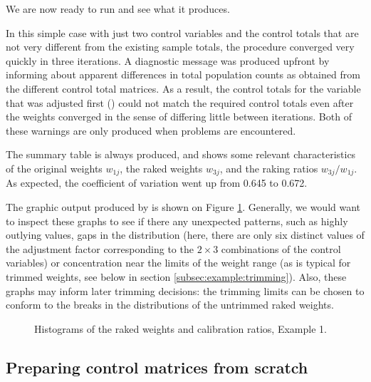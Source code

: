 \begin{stexample}[Example 1]
We are now ready to run  and see what it produces.

\begin{stlog}
\nullskip
\end{stlog}

In this simple case with just two control variables
and the control totals that are not very different from the
existing sample totals, the procedure converged very quickly
in three iterations. A diagnostic message was produced upfront
by  informing about apparent differences in
total population counts as obtained from the different
control total matrices. As a result, the control totals
for the variable that was adjusted first ()
could not match the required control totals even after the
weights converged in the sense of differing little between
iterations. Both of these warnings are only produced when
problems are encountered.

The summary table is always produced, and shows some relevant
characteristics of the original weights $w_{1j}$, the raked weights
$w_{3j}$, and the raking ratios $w_{3j}/w_{1j}$. As expected,
the coefficient of variation went up from 0.645 to 0.672.

The graphic output produced by  is shown on
Figure \ref{fig:example1}. Generally, we would want to inspect these
graphs to see if there any unexpected patterns, such as highly outlying values,
gaps in the distribution (here, there are only six distinct values of the
adjustment factor corresponding to the $2\times3$ combinations of the control
variables) or concentration near the limits of the
weight range (as is typical for trimmed weights, see below in section
\ref{subsec:example:trimming}). Also, these graphs
may inform later trimming decisions: the trimming limits can be
chosen to conform to the breaks in the distributions of
the untrimmed raked weights.

\begin{figure}[h!]
\begin{center}
\end{center}
\caption{Histograms of the raked weights and calibration ratios, Example 1.}
\label{fig:example1}
\end{figure}

\end{stexample}

\subsection{Preparing control matrices from scratch}
\label{subsec:acs}

